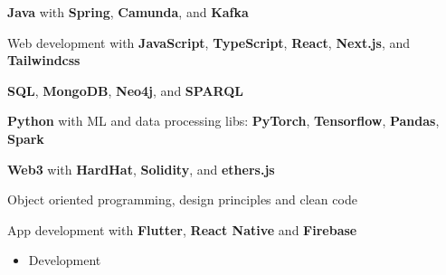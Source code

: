 



\medskip




\begin{coloritemize}
    \item \textbf{Java} with \textbf{Spring}, \textbf{Camunda}, and \textbf{Kafka} 
    \item Web development with \textbf{JavaScript}, \textbf{TypeScript}, \textbf{React}, \textbf{Next.js}, and \textbf{Tailwindcss}
    \item \textbf{SQL}, \textbf{MongoDB}, \textbf{Neo4j}, and \textbf{SPARQL} 
    \item \textbf{Python} with ML and data processing libs: \textbf{PyTorch}, \textbf{Tensorflow}, \textbf{Pandas},  \textbf{Spark}
    \item \textbf{Web3} with \textbf{HardHat}, \textbf{Solidity}, and \textbf{ethers.js}
    \item Object oriented programming, design principles and clean code
    \item App development with \textbf{Flutter}, \textbf{React Native} and \textbf{Firebase}
\end{coloritemize}



\iffalse



\begin{itemize}
\item \textcolor{emphasis}{Development} 
\end{itemize}
\divider\smallskip


